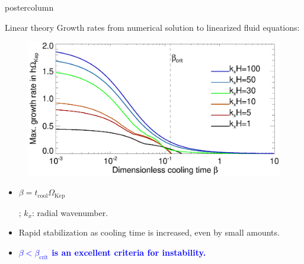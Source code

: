 \documentclass[final,hyperref={pdfpagelabels=false}]{beamer}
\begin{document}
\begin{frame}
\begin{columns}
\begin{column}{.49\textwidth}
\begin{beamercolorbox}[center,wd=\textwidth]{postercolumn}
\begin{minipage}[T]{.95\textwidth}
{            
            \begin{block}{\Large Linear theory}
              \justifying
              Growth rates from numerical solution to linearized fluid
              equations:\\
              \vspace{-1.16cm}
              \begin{figure}
                 \includegraphics[width=\linewidth]{figures/gcorr_compare_iso_maxrate_z5.ps}%
               \end{figure}
               \vspace{-1.cm}
               \begin{itemize}
               \item \begin{onlinebox}{8cm}$\beta =
                   t_\mathrm{cool}\Omega_\mathrm{Kep}$\end{onlinebox};
                 $k_x$: radial wavenumber. 
               \item Rapid stabilization as cooling time is increased,
                 even by small amounts.
               \item \begin{onlinebox}{27cm} \textcolor{blue}{\bf{$\beta<\beta_\mathrm{crit}$ 
                       is an excellent criteria for instability.}}\end{onlinebox}
               \end{itemize}
               \vspace{-0.65cm}
             \end{block}
             
}
\end{minipage}
\end{beamercolorbox}
\end{column}
\end{columns}
\end{frame}
\end{document}
